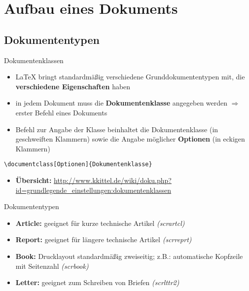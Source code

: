 \section{Aufbau eines Dokuments}

\subsection{Dokumententypen}
\begin{frame}[fragile]{Dokumentenklassen}
\begin{itemize}
\item \LaTeX{} bringt standardmäßig verschiedene Grunddokumententypen mit, die \textbf{verschiedene Eigenschaften} haben \newline
\item in jedem Dokument muss die \textbf{Dokumentenklasse} angegeben werden $\Rightarrow$ erster Befehl eines Dokuments \newline
\item Befehl zur Angabe der Klasse beinhaltet die Dokumentenklasse (in geschweiften Klammern) sowie die Angabe möglicher \textbf{Optionen} (in eckigen Klammern)
\end{itemize}
\begin{lstlisting}[style=tex]
\documentclass[Optionen]{Dokumentenklasse}\end{lstlisting}
\begin{itemize}
\item \textbf{Übersicht:} \url{http://www.kkittel.de/wiki/doku.php?id=grundlegende_einstellungen:dokumentenklassen}
\end{itemize}
\end{frame}


\begin{frame}{Dokumententypen}
\begin{itemize}
\item \textbf{Article:} geeignet für kurze technische Artikel \textit{(scrartcl)}
\item \textbf{Report:} geeignet für längere technische Artikel \textit{(scrreprt)}
\item \textbf{Book:} Drucklayout standardmäßig zweiseitig; z.B.: automatische Kopfzeile mit Seitenzahl \textit{(scrbook)}

\item \textbf{Letter:} geeignet zum Schreiben von Briefen \textit{(scrlttr2)}
\end{itemize}
\end{frame}

